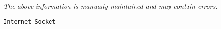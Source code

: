 \label{pkg:internet\_socket}

{\tiny \it The above information is manually maintained and may contain errors.}
\begin{verbatim}
Internet_Socket
\end{verbatim}
